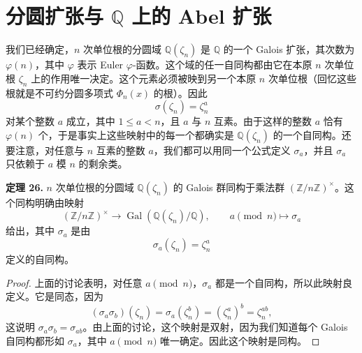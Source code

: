 \section{分圆扩张与 $\mathbb Q$ 上的 Abel 扩张}

我们已经确定，$n$ 次单位根的分圆域 $\mathbb Q(\zeta_n)$ 是 $\mathbb Q$ 的一个 Galois 扩张，其次数为 $\varphi(n)$，其中 $\varphi$ 表示 Euler $\varphi$-函数。这个域的任一自同构都由它在本原 $n$ 次单位根 $\zeta_n$ 上的作用唯一决定。这个元素必须被映到另一个本原 $n$ 次单位根（回忆这些根就是不可约分圆多项式 $\Phi_n(x)$ 的根）。因此
\[
\sigma(\zeta_n)=\zeta_n^a
\]
对某个整数 $a$ 成立，其中 $1\leq a<n$，且 $a$ 与 $n$ 互素。由于这样的整数 $a$ 恰有 $\varphi(n)$ 个，于是事实上这些映射中的每一个都确实是 $\mathbb Q(\zeta_n)$ 的一个自同构。还要注意，对任意与 $n$ 互素的整数 $a$，我们都可以用同一个公式定义 $\sigma_a$，并且 $\sigma_a$ 只依赖于 $a$ 模 $n$ 的剩余类。

\noindent\textbf{定理 26.} $n$ 次单位根的分圆域 $\mathbb Q(\zeta_n)$ 的 Galois 群同构于乘法群 $(\mathbb Z/n\mathbb Z)^\times$。这个同构明确由映射
\[
(\mathbb Z/n\mathbb Z)^\times\longrightarrow \operatorname{Gal}(\mathbb Q(\zeta_n)/\mathbb Q),
\qquad
 a\pmod n\longmapsto \sigma_a
\]
给出，其中 $\sigma_a$ 是由
\[
\sigma_a(\zeta_n)=\zeta_n^a
\]
定义的自同构。

\begin{proof}
上面的讨论表明，对任意 $a\pmod n$，$\sigma_a$ 都是一个自同构，所以此映射良定义。它是同态，因为
\[
(\sigma_a\sigma_b)(\zeta_n)=\sigma_a(\zeta_n^b)=(\zeta_n^a)^b=\zeta_n^{ab},
\]
这说明 $\sigma_a\sigma_b=\sigma_{ab}$。由上面的讨论，这个映射是双射，因为我们知道每个 Galois 自同构都形如 $\sigma_a$，其中 $a\pmod n$ 唯一确定。因此这个映射是同构。
\end{proof}

